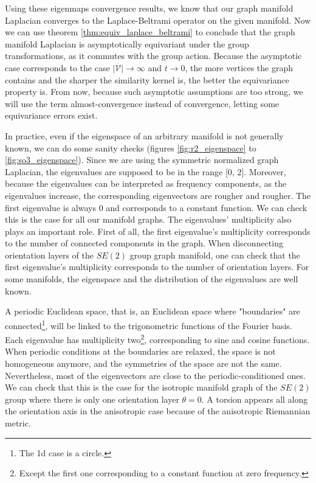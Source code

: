 \documentclass{article}
\begin{document}
Using these eigenmaps convergence results, we know that our graph manifold Laplacian converges to the Laplace-Beltrami operator on the given manifold. Now we can use theorem \ref{thm:equiv_laplace_beltrami} to conclude that the graph manifold Laplacian is asymptotically equivariant under the group transformations, as it commutes with the group action. Because the asymptotic case corresponds to the case $|\mathcal{V}| \to \infty$ and $t \to 0$, the more vertices the graph contains and the sharper the similarity kernel is, the better the equivariance property is. From now, because such asymptotic assumptions are too strong, we will use the term almost-convergence instead of convergence, letting some equivariance errors exist.

In practice, even if the eigenspace of an arbitrary manifold is not generally known, we can do some sanity checks (figures \ref{fig:r2_eigenspace} to \ref{fig:so3_eigenspace}). Since we are using the symmetric normalized graph Laplacian, the eigenvalues are supposed to be in the range [0, 2]. Moreover, because the eigenvalues can be interpreted as frequency components, as the eigenvalues increase, the corresponding eigenvectors are rougher and rougher. The first eigenvalue is always 0 and corresponds to a constant function. We can check this is the case for all our manifold graphs. The eigenvalues' multiplicity also plays an important role. First of all, the first eigenvalue's multiplicity corresponds to the number of connected components in the graph. When disconnecting orientation layers of the $SE(2)$ group graph manifold, one can check that the first eigenvalue's multiplicity corresponds to the number of orientation layers. For some manifolds, the eigenspace and the distribution of the eigenvalues are well known. 

A periodic Euclidean space, that is, an Euclidean space where "boundaries" are connected\footnote{The 1d case is a circle.}, will be linked to the trigonometric functions of the Fourier basis. Each eigenvalue has multiplicity two\footnote{Except the first one corresponding to a constant function at zero frequency.}, corresponding to sine and cosine functions. When periodic conditions at the boundaries are relaxed, the space is not homogeneous anymore, and the symmetries of the space are not the same. Nevertheless, most of the eigenvectors are close to the periodic-conditioned ones. We can check that this is the case for the isotropic manifold graph of the $SE(2)$ group where there is only one orientation layer $\theta = 0$. A torsion appears all along the orientation axis in the anisotropic case because of the anisotropic Riemannian metric. 
\end{document}
